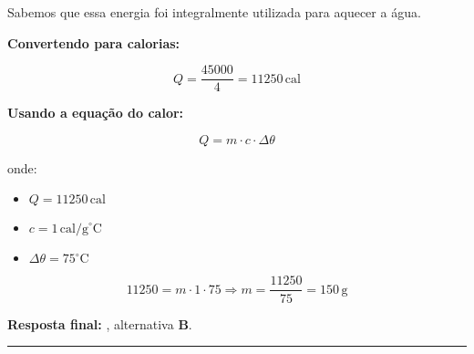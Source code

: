 \documentclass[a4paper,12pt]{article}
\begin{document}
\begin{flushleft}
Sabemos que essa energia foi integralmente utilizada para aquecer a água.

\textbf{Convertendo para calorias:}

\[
Q = \frac{45000}{4} = 11250\,\text{cal}
\]

\textbf{Usando a equação do calor:}

\[
Q = m \cdot c \cdot \Delta \theta
\]

onde:

\begin{itemize}
    \item $Q = 11250\,\text{cal}$
    \item $c = 1\,\text{cal/g}^\circ\text{C}$
    \item $\Delta \theta = 75^\circ\text{C}$
\end{itemize}

\[
11250 = m \cdot 1 \cdot 75 \Rightarrow m = \frac{11250}{75} = \boxed{150\,\text{g}}
\]

\vspace{0.3cm}
\textbf{Resposta final:} , alternativa \colorbox{green!50}{\textbf{B}}.

\end{flushleft}

\noindent\rule{\linewidth}{0.6pt}\\
\end{document}
